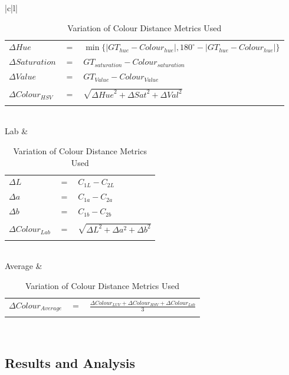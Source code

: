 \begin{table}[!ht]
\begin{tabular}{|c|l|}
\begin{tabular}{lcl}
$\Delta{Hue}$ & $=$ & $\min\{ \mid GT_{hue} - Colour_{hue} \mid,  180^{\circ} - \mid GT_{hue} - Colour_{hue} \mid  \}$ \\
$\Delta  Saturation$ & $=$ & $GT_{saturation} - Colour_{saturation}$ \\
$\Delta  Value$ &  $=$ & $GT_{Value} - Colour_{Value}$ \\
\\
$\Delta Colour_{HSV}$ & $=$ & $\sqrt{\Delta{Hue}^{2} + \Delta{Sat}^{2}  + \Delta{Val}^{2} }$
\\
\hspace{4em}& & \\
\end{tabular}\\
\hline
Lab &
\begin{tabular}{lcl}
\\
$\Delta L$ & $=$ & $C_{1L} - C_{2L}$\\
$\Delta a$ & $=$ & $C_{1a} - C_{2a}$\\
$\Delta b$ & $=$ & $C_{1b} - C_{2b}$\\
\\
$\Delta{Colour_{Lab}}$ & $=$ & $\sqrt{\Delta{L}^{2} + \Delta{a}^{2}  + \Delta{b}^{2} }$
\\
\hspace{5em}& & \\
\end{tabular}\\
\hline
Average &
\begin{tabular}{lcl}
\\
$\Delta{Colour_{Average}}$ & $=$ & $\frac{\Delta{Colour_{LUV}} + \Delta{Colour_{HSV}} + \Delta{Colour_{Lab}}}{3}$
\\
\hspace{4em}& & \\
\end{tabular}\\
\hline
\end{tabular}
\caption{Variation of Colour Distance Metrics Used}
\label{table:ColorVariation}
\end{table}


\subsection{Results and Analysis}


